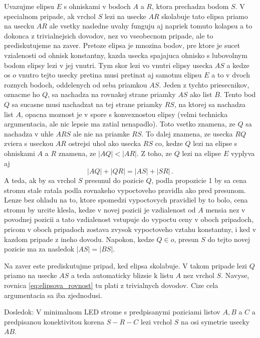 \documentclass[12pt]{book}
\begin{document}
Uvazujme elipsu $E$ s ohniskami v bodoch $A$ a $R$, ktora prechadza bodom $S$.
V specialnom pripade, ak vrchol $S$ lezi na usecke $AR$ skolabuje tato elipsa
    priamo na usecku $AR$ ale vsetky nasledne uvahy funguju aj napriek tomuto
    kolapsu a to dokonca z trivialnejsich dovodov, nez vo vseobecnom pripade,
    ale to prediskutujeme na zaver.
Pretoze elipsa je mnozina bodov, pre ktore je sucet vzialenosti od ohnisk
    konstantny, kazda usecka spajajuca ohnisko s lubovolnym bodom elipsy lezi
    v jej vnutri.
Tym skor lezi vo vnutri elipsy usecka $AS$ a kedze os $o$ vnutro tejto usecky
    pretina musi pretinat aj samotnu elipsu $E$ a to v dvoch roznych bodoch,
    oddelenych od seba priamkou $AS$.
Jeden z tychto priesecnikov, oznacme ho $Q$, sa nachadza na rovnakej strane
    priamky $AS$ ako list $B$.
Tento bod $Q$ sa sucasne musi nachadzat na tej strane priamky $RS$, na ktorej
    sa nachadza list $A$, opacna moznost je v spore s konvexnostou elipsy
    (velmi technicka argumentacia, ale nic lepsie ma zatial nenapadlo).
Toto vsetko znamena, ze $Q$ sa nachadza v uhle $ARS$ ale nie na priamke $RS$.
To dalej znamena, ze usecka $RQ$ zviera s useckou $AR$ ostrejsi uhol ako usecka
    $RS$ co, kedze $Q$ lezi na elipse s ohniskami $A$ a $R$ znamena, ze
    $|AQ|<|AR|$.
Z toho, ze $Q$ lezi na elipse $E$ vyplyva aj
    \begin{equation}\label{eq:elipsova_rovnost}
        |AQ| + |QR|
        =
        |AS| + |SR|\,.
    \end{equation}
A teda, ak by sa vrchol $S$ presunul do pozicie $Q$, podla propozicie 1 by
    sa cena stromu stale ratala podla rovnakeho vypoctoveho pravidla ako pred
    presunom.
Lenze bez ohladu na to, ktore spomedzi vypoctovych pravidiel by to bolo, cena
    stromu by urcite klesla, kedze v novej pozicii je vzdialenost od $A$
    mensia nez v povodnej pozicii a tato vzdialenost vstupuje do vypoctu
    ceny v oboch pripadoch, pricom v oboch pripadoch zostava zvysok vypoctoveho
    vztahu konstantny, i ked v kazdom pripade z ineho dovodu.
Napokon, kedze $Q\in o$, presun $S$ do tejto novej pozicie ma za nasledok
    $|AS|=|BS|$.

Na zaver este prediskutujme pripad, ked elipsa skolabuje.
V takom pripade lezi $Q$ priamo na usecke $AS$ a teda automaticky blizsie
    k listu $A$ nez vrchol $S$.
Navyse, rovnica \eqref{eq:elipsova_rovnost} tu plati z trivialnych dovodov.
Cize cela argumentacia sa iba zjednodusi.

Dosledok:
V minimalnom LED strome s predpisanymi poziciami listov $A,B$ a $C$ a
    predpisanou konektivitou korena $S-R-C$ lezi vrchol $S$ na osi symetrie
    usecky $AB$.
\end{document}
